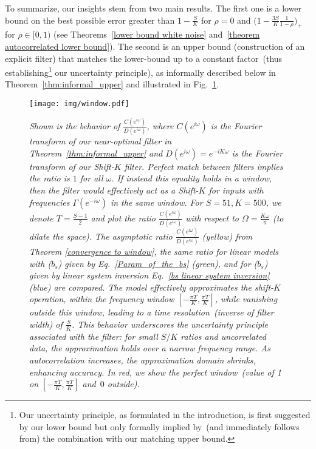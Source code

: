 To summarize, our insights stem from two main results. The first one is a lower bound on the best possible error greater than  $1- \frac{S}{K}$ for $\rho=0$ and $\big(1 - \frac{3S}{K} \frac{1}{1-\rho} \big)_+$ for $\rho \in [0,1)$ (see Theorems~\ref{lower bound white noise} and~\ref{theorem 
autocorrelated lower bound}). The second is an upper bound (construction of an explicit filter) that matches the lower-bound up to a constant factor~(thus establishing\footnote{Our uncertainty principle, as formulated in the introduction, is first suggested by our lower bound but only formally implied by~(and immediately follows from) the combination with our matching upper bound.} our uncertainty principle), as informally described below in Theorem~\ref{thm:informal_upper} and illustrated in Fig.~\ref{fig:window}.

\begin{figure}[H]
\vspace{-1mm}
    \centering
    \texttt{[image: img/window.pdf]}

    \vspace*{-.2cm}
    
    \caption{\textit{Shown is the behavior of $\frac{C(e^{i\omega})}{D(e^{i\omega})}$, where $C(e^{i\omega})$ is the Fourier transform of our near-optimal filter in Theorem~\ref{thm:informal_upper} and $D(e^{i\omega}) = e^{-iK\omega}$ is the Fourier transform of our Shift-$K$ filter. Perfect match between filters implies the ratio is $1$ for all $\omega$.  If instead this equality holds in a window, then the filter would effectively act as a Shift-$K$ for inputs with frequencies $\Gamma(e^{-i\omega})$ in the same window. For $S=51, K=500$, we denote $T = \frac{S-1}{2}$ and plot the ratio $\frac{C(e^{i\omega})}{D(e^{i\omega})}$ with respect to $\Omega=\frac{K\omega}{\pi}$ (to dilate the space). The asymptotic ratio $\frac{C(e^{i\omega})}{D(e^{i\omega})}$ (yellow) from Theorem \ref{convergence to window}, the same ratio for linear models with ($b_s$) given by Eq.~\eqref{Param_of_the_bs} (green), and for ($b_s$) given by linear system inversion Eq.~\eqref{bs linear system inversion} (blue) are compared. The model effectively approximates the shift-$K$ operation, within the frequency window $[-\frac{\pi T}{K}, \frac{\pi T}{K}]$, while vanishing outside this window, leading to a time resolution~(inverse of filter width) of $\frac{S}{K}$. This behavior underscores the uncertainty principle associated with the filter: for small $S/K$ ratios and uncorrelated data, the approximation holds over a narrow frequency range. As autocorrelation increases, the approximation domain shrinks, enhancing accuracy. In red, we show the perfect window~(value of 1 on $[-\frac{\pi T}{K}, \frac{\pi T}{K}]$ and~$0$ outside).}
}
    \label{fig:window}
\end{figure}

